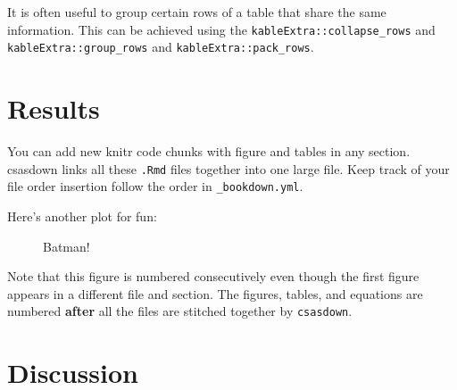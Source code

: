 \documentclass[12pt]{article}\usepackage[]{graphicx}\usepackage[]{color}
\begin{document}
It is often useful to group certain rows of a table that share the same information. This can be achieved using the \texttt{kableExtra::collapse\_rows} and \texttt{kableExtra::group\_rows} and \texttt{kableExtra::pack\_rows}.

\hypertarget{results}{%
\section{Results}\label{results}}

You can add new knitr code chunks with figure and tables in any section. csasdown links all these \texttt{.Rmd} files together into one large file. Keep track of your file order insertion follow the order in \texttt{\_bookdown.yml}.

Here's another plot for fun:




\begin{figure}[htb]

{\centering {} 

}

\caption{Batman!}\label{fig:batman}
\end{figure}
Note that this figure is numbered consecutively even though the first figure appears in a different file and section. The figures, tables, and equations are numbered \textbf{after} all the files are stitched together by \texttt{csasdown}.

\hypertarget{discussion}{%
\section{Discussion}\label{discussion}}
\end{document}
